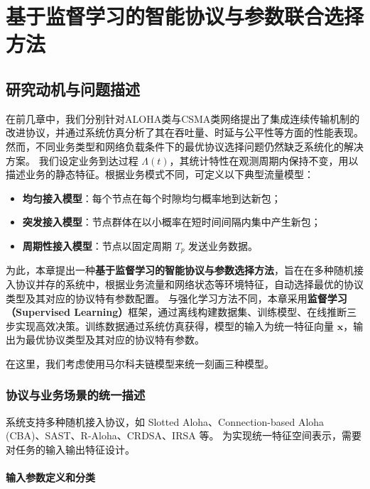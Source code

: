 \chapter{基于监督学习的智能协议与参数联合选择方法}
\label{cha:ai_selector}

\section{研究动机与问题描述}

在前几章中，我们分别针对ALOHA类与CSMA类网络提出了集成连续传输机制的改进协议，并通过系统仿真分析了其在吞吐量、时延与公平性等方面的性能表现。 然而，不同业务类型和网络负载条件下的最优协议选择问题仍然缺乏系统化的解决方案。  
我们设定业务到达过程 $\Lambda(t)$，其统计特性在观测周期内保持不变，用以描述业务的静态特征。根据业务模式不同，可定义以下典型流量模型：
\begin{itemize}
	\item \textbf{均匀接入模型}：每个节点在每个时隙均匀概率地到达新包；
	\item \textbf{突发接入模型}：节点群体在以小概率在短时间间隔内集中产生新包；
	\item \textbf{周期性接入模型}：节点以固定周期 $T_p$ 发送业务数据。
\end{itemize}

为此，本章提出一种\textbf{基于监督学习的智能协议与参数选择方法}，旨在在多种随机接入协议并存的系统中，根据业务流量和网络状态等环境特征，自动选择最优的协议类型及其对应的协议特有参数配置。  
与强化学习方法不同，本章采用\textbf{监督学习（Supervised Learning）}框架，通过离线构建数据集、训练模型、在线推断三步实现高效决策。训练数据通过系统仿真获得，模型的输入为统一特征向量 $\mathbf{x}$，输出为最优协议类型及其对应的协议特有参数。


在这里，我们考虑使用马尔科夫链模型来统一刻画三种模型。


\subsection{协议与业务场景的统一描述}

系统支持多种随机接入协议，如 Slotted Aloha、Connection-based Aloha (CBA)、SAST、R-Aloha、CRDSA、IRSA 等。  
为实现统一特征空间表示，需要对任务的输入输出特征设计。

\subsubsection{输入参数定义和分类}

